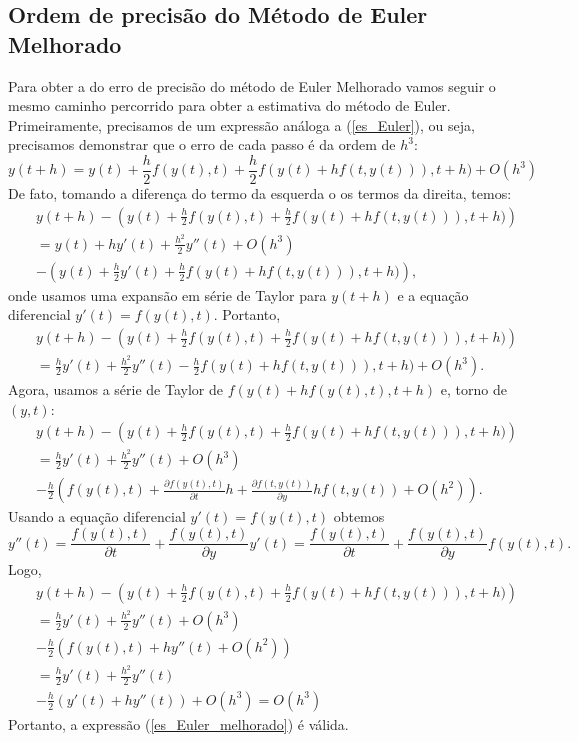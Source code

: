 \subsection{Ordem de precisão do Método de Euler Melhorado}
Para obter a do erro de precisão do método de Euler Melhorado vamos seguir o mesmo caminho percorrido para obter a estimativa do método de Euler. Primeiramente, precisamos de um expressão análoga a (\ref{es_Euler}), ou seja, precisamos demonstrar que o erro de cada passo é da ordem de $h^3$:
\begin{equation}\label{es_Euler_melhorado}
y(t+h)=y(t)+\frac{h}{2} f(y(t),t)+\frac{h}{2} f(y(t)+hf(t,y(t))),t+h)+O(h^3)
\end{equation}
De fato, tomando a diferença do termo da esquerda o os termos da direita, temos:
\begin{eqnarray*}
&&y(t+h)-\left(y(t)+\frac{h}{2} f(y(t),t)+\frac{h}{2} f(y(t)+hf(t,y(t))),t+h)\right)\\
&&=y(t)+hy'(t)+\frac{h^2}{2}y''(t)+O(h^3)\\
&&-\left(y(t)+\frac{h}{2} y'(t)+\frac{h}{2} f(y(t)+hf(t,y(t))),t+h)\right),
\end{eqnarray*}
onde usamos uma expansão em série de Taylor para $y(t+h)$ e a equação diferencial $y'(t)=f(y(t),t)$. Portanto,
\begin{eqnarray*}
&&y(t+h)-\left(y(t)+\frac{h}{2} f(y(t),t)+\frac{h}{2} f(y(t)+hf(t,y(t))),t+h)\right)\\
&&=\frac{h}{2}y'(t)+\frac{h^2}{2}y''(t)-\frac{h}{2} f(y(t)+hf(t,y(t))),t+h)+O(h^3).
\end{eqnarray*}
Agora, usamos a série de Taylor de $f(y(t)+hf(y(t),t),t+h)$ e, torno de $(y,t)$:
\begin{eqnarray*}
&&y(t+h)-\left(y(t)+\frac{h}{2} f(y(t),t)+\frac{h}{2} f(y(t)+hf(t,y(t))),t+h)\right)\\
&&=\frac{h}{2}y'(t)+\frac{h^2}{2}y''(t)+O(h^3)\\
&&-\frac{h}{2}\left(f(y(t),t)+\frac{\partial f(y(t),t) }{\partial t}h +\frac{\partial f(t,y(t))}{\partial y} hf(t,y(t))+O(h^2)\right).
\end{eqnarray*}
Usando a equação diferencial $y'(t)=f(y(t),t)$ obtemos 
$$
y''(t)=\frac{f(y(t),t)}{\partial t}+\frac{f(y(t),t)}{\partial y}y'(t)=\frac{f(y(t),t)}{\partial t}+\frac{f(y(t),t)}{\partial y}f(y(t),t).
$$
Logo,
\begin{eqnarray*}
&&y(t+h)-\left(y(t)+\frac{h}{2} f(y(t),t)+\frac{h}{2} f(y(t)+hf(t,y(t))),t+h)\right)\\
&&=\frac{h}{2}y'(t)+\frac{h^2}{2}y''(t)+O(h^3)\\
&&-\frac{h}{2}\left(f(y(t),t)+hy''(t)+O(h^2)\right)\\
&&=\frac{h}{2}y'(t)+\frac{h^2}{2}y''(t)\\
&&-\frac{h}{2}\left(y'(t)+hy''(t)\right)+O(h^3)=O(h^3)
\end{eqnarray*}
Portanto, a expressão (\ref{es_Euler_melhorado}) é válida. 

